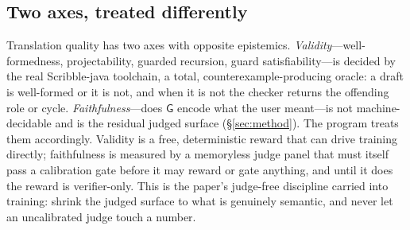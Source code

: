 \documentclass{article}
\newcommand{\gtG}{\mathsf{G}}
\begin{document}
\subsection{Two axes, treated differently}
Translation quality has two axes with opposite epistemics. \emph{Validity}---well-formedness, projectability, guarded recursion, guard satisfiability---is decided by the real Scribble-java toolchain, a total, counterexample-producing oracle: a draft is well-formed or it is not, and when it is not the checker returns the offending role or cycle. \emph{Faithfulness}---does $\gtG$ encode what the user meant---is not machine-decidable and is the residual judged surface (\S\ref{sec:method}). The program treats them accordingly. Validity is a free, deterministic reward that can drive training directly; faithfulness is measured by a memoryless judge panel that must itself pass a calibration gate before it may reward or gate anything, and until it does the reward is verifier-only. This is the paper's judge-free discipline carried into training: shrink the judged surface to what is genuinely semantic, and never let an uncalibrated judge touch a number.
\end{document}
